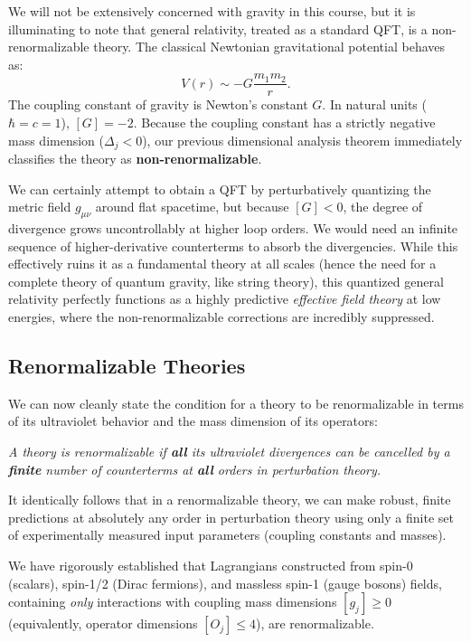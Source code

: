 \begin{example}[Gravity]
    We will not be extensively concerned with gravity in this course, but it is illuminating to note that general relativity, treated as a standard QFT, is a non-renormalizable theory. The classical Newtonian gravitational potential behaves as:
    \[
        V(r) \sim -G \frac{m_1 m_2}{r}.
    \]
    The coupling constant of gravity is Newton's constant $G$. In natural units ($\hbar = c = 1$), $[G] = -2$. Because the coupling constant has a strictly negative mass dimension ($\Delta_j < 0$), our previous dimensional analysis theorem immediately classifies the theory as \textbf{non-renormalizable}.

    We can certainly attempt to obtain a QFT by perturbatively quantizing the metric field $g_{\mu\nu}$ around flat spacetime, but because $[G] < 0$, the degree of divergence grows uncontrollably at higher loop orders. We would need an infinite sequence of higher-derivative counterterms to absorb the divergencies. While this effectively ruins it as a fundamental theory at all scales (hence the need for a complete theory of quantum gravity, like string theory), this quantized general relativity perfectly functions as a highly predictive \textit{effective field theory} at low energies, where the non-renormalizable corrections are incredibly suppressed.
\end{example}

\subsection{Renormalizable Theories}

We can now cleanly state the condition for a theory to be renormalizable in terms of its ultraviolet behavior and the mass dimension of its operators:
\begin{center}
    \textit{A theory is renormalizable if \textbf{all} its ultraviolet divergences can be cancelled by a \textbf{finite} number of counterterms at \textbf{all} orders in perturbation theory.}
\end{center}

It identically follows that in a renormalizable theory, we can make robust, finite predictions at absolutely any order in perturbation theory using only a finite set of experimentally measured input parameters (coupling constants and masses).

We have rigorously established that Lagrangians constructed from spin-0 (scalars), spin-1/2 (Dirac fermions), and massless spin-1 (gauge bosons) fields, containing \textit{only} interactions with coupling mass dimensions $[g_j] \geq 0$ (equivalently, operator dimensions $[O_j] \leq 4$), are renormalizable.

